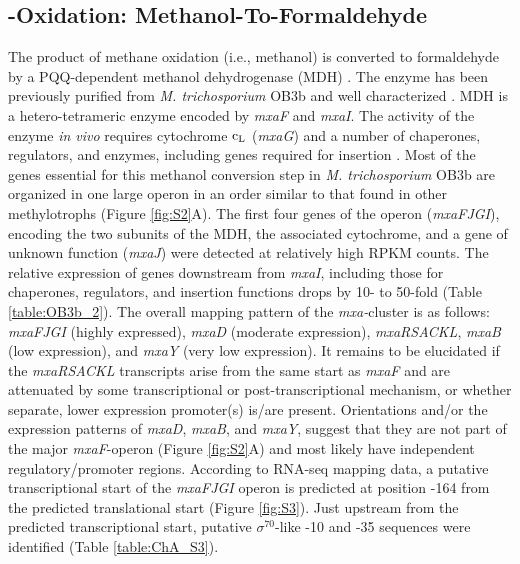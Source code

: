 \subsection{-Oxidation: Methanol-To-Formaldehyde}
The product of methane oxidation (i.e., methanol) is converted to formaldehyde by a PQQ-dependent methanol dehydrogenase (MDH) \cite{anthony1982, anthony2002, yamada1992, anthony1994}. %
The enzyme has been previously purified from \textit{M. trichosporium} OB3b and well characterized \cite{yamada1992}.  %
MDH is a hetero-tetrameric enzyme encoded by \textit{mxaF} and \textit{mxaI}.
The activity of the enzyme \textit{in vivo} requires cytochrome {${\text c_{\text L}}$} (\textit{mxaG}) and a number of chaperones, regulators, and enzymes, including genes required for  insertion \cite{anthony1994, anthony2002}.
Most of the genes essential for this methanol conversion step in \textit{M. trichosporium} OB3b are organized in one large operon in an order similar to that found in other methylotrophs (Figure \ref{fig:S2}A).
The first four genes of the operon (\textit{mxaFJGI}), encoding the two subunits of the MDH, the associated cytochrome, and a gene of unknown function (\textit{mxaJ}) were detected at relatively high RPKM counts.
The relative expression of genes downstream from \textit{mxaI}, including those for chaperones, regulators, and  insertion functions drops by 10- to 50-fold (Table \ref{table:OB3b_2}).
The overall mapping pattern of the \textit{mxa-}cluster is as follows: \textit{mxaFJGI} (highly expressed), \textit{mxaD} (moderate expression), \textit{mxaRSACKL}, \textit{mxaB} (low expression), and \textit{mxaY} (very low expression).
It remains to be elucidated if the \textit{mxaRSACKL} transcripts arise from the same start as \textit{mxaF} and are attenuated by some transcriptional or post-transcriptional mechanism, or whether separate, lower expression promoter(s) is/are present.
Orientations and/or the expression patterns of \textit{mxaD}, \textit{mxaB}, and \textit{mxaY}, suggest that they are not part of the major \textit{mxaF}-operon (Figure \ref{fig:S2}A) and most likely have independent regulatory/promoter regions.
According to RNA-seq mapping data, a putative transcriptional start of the \textit{mxaFJGI} operon is predicted at position -164 from the predicted translational start (Figure \ref{fig:S3}).
Just upstream from the predicted transcriptional start, putative $\sigma^{70}$-like -10 and -35 sequences were identified (Table \ref{table:ChA_S3}).

